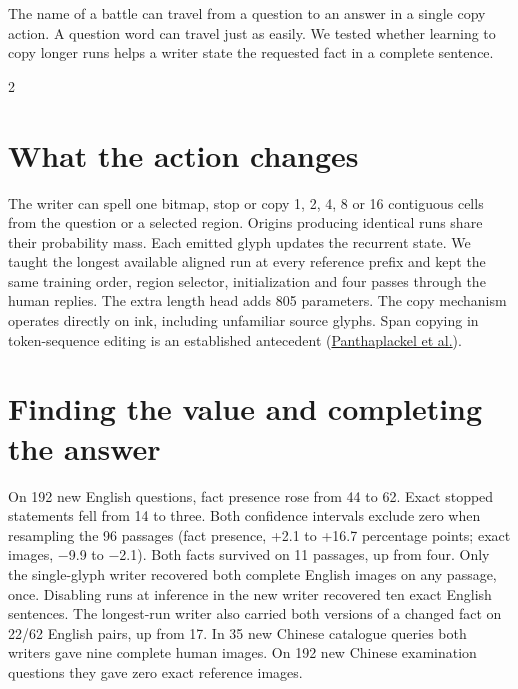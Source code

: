 \noindent The name of a battle can travel from a question to an answer in a single copy action. A question word can travel just as easily. We tested whether learning to copy longer runs helps a writer state the requested fact in a complete sentence.
\begin{multicols}{2}
\section*{What the action changes}
The writer can spell one bitmap, stop or copy 1, 2, 4, 8 or 16 contiguous cells from the question or a selected region. Origins producing identical runs share their probability mass. Each emitted glyph updates the recurrent state. We taught the longest available aligned run at every reference prefix and kept the same training order, region selector, initialization and four passes through the human replies. The extra length head adds 805 parameters. The copy mechanism operates directly on ink, including unfamiliar source glyphs. Span copying in token-sequence editing is an established antecedent (\href{https://arxiv.org/abs/2006.04771}{Panthaplackel et al.}).
\section*{Finding the value and completing the answer}
On 192 new English questions, fact presence rose from 44 to 62. Exact stopped statements fell from 14 to three. Both confidence intervals exclude zero when resampling the 96 passages (fact presence, +2.1 to +16.7 percentage points; exact images, $-$9.9 to $-$2.1). Both facts survived on 11 passages, up from four. Only the single-glyph writer recovered both complete English images on any passage, once. Disabling runs at inference in the new writer recovered ten exact English sentences. The longest-run writer also carried both versions of a changed fact on 22/62 English pairs, up from 17. In 35 new Chinese catalogue queries both writers gave nine complete human images. On 192 new Chinese examination questions they gave zero exact reference images.

\end{multicols}
